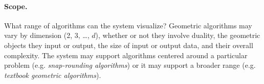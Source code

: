 


\paragraph{Scope.} What range of algorithms can the system visualize? Geometric
algorithms may vary by dimension (2, 3,  \ldots, $d$), whether or not they
involve duality, the geometric objects they input or output, the size of input
or output data, and their overall complexity. The system may support algorithms
centered around a particular problem (e.g. \emph{snap-rounding algorithms}) or
it may support a broader range (e.g. \emph{textbook geometric algorithms}).


